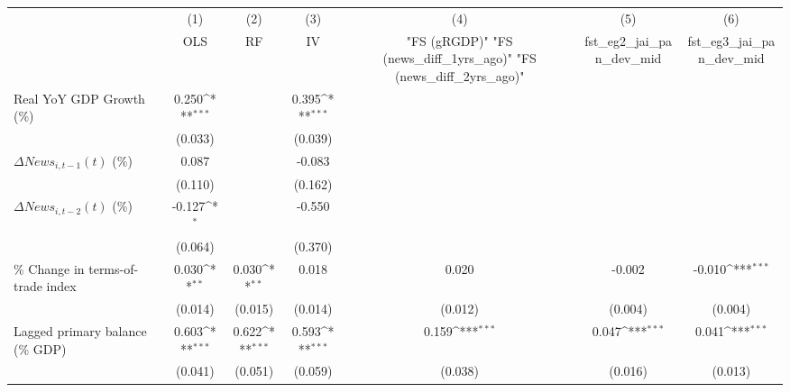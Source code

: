 {
\def\sym#1{\ifmmode^{#1}\else\(^{#1}\)\fi}
\begin{tabular}{l*{6}{c}}
\toprule
                    &\multicolumn{1}{c}{(1)}&\multicolumn{1}{c}{(2)}&\multicolumn{1}{c}{(3)}&\multicolumn{1}{c}{(4)}&\multicolumn{1}{c}{(5)}&\multicolumn{1}{c}{(6)}\\
                    &\multicolumn{1}{c}{OLS}&\multicolumn{1}{c}{RF}&\multicolumn{1}{c}{IV}&\multicolumn{1}{c}{ "FS (gRGDP)"  "FS (news_diff_1yrs_ago)"  "FS (news_diff_2yrs_ago)" }&\multicolumn{1}{c}{fst_eg2_jai_pan_dev_mid}&\multicolumn{1}{c}{fst_eg3_jai_pan_dev_mid}\\
\midrule
Real YoY GDP Growth (\%)&       0.250\sym{***}&                     &       0.395\sym{***}&                     &                     &                     \\
                    &     (0.033)         &                     &     (0.039)         &                     &                     &                     \\
\addlinespace
$ \Delta News_{i,t-1}(t)$ (\%)&       0.087         &                     &      -0.083         &                     &                     &                     \\
                    &     (0.110)         &                     &     (0.162)         &                     &                     &                     \\
\addlinespace
$ \Delta News_{i,t-2}(t)$ (\%)&      -0.127\sym{*}  &                     &      -0.550         &                     &                     &                     \\
                    &     (0.064)         &                     &     (0.370)         &                     &                     &                     \\
\addlinespace
\% Change in terms-of-trade index&       0.030\sym{**} &       0.030\sym{**} &       0.018         &       0.020         &      -0.002         &      -0.010\sym{***}\\
                    &     (0.014)         &     (0.015)         &     (0.014)         &     (0.012)         &     (0.004)         &     (0.004)         \\
\addlinespace
Lagged primary balance (\% GDP)&       0.603\sym{***}&       0.622\sym{***}&       0.593\sym{***}&       0.159\sym{***}&       0.047\sym{***}&       0.041\sym{***}\\
                    &     (0.041)         &     (0.051)         &     (0.059)         &     (0.038)         &     (0.016)         &     (0.013)         \\

\end{tabular}}
